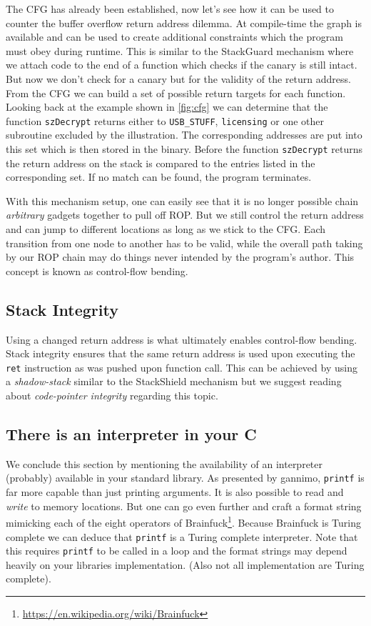 \documentclass[article]{uibk}
\begin{document}
The CFG has already been established, now let's see how it can be used to
counter the buffer overflow return address dilemma. At compile-time the graph
is available and can be used to create additional constraints which the program
must obey during runtime. This is similar to the StackGuard mechanism where we
attach code to the end of a function which checks if the canary is still
intact. But now we don't check for a canary but for the validity of the return
address. From the CFG we can build a set of possible return targets for each
function. Looking back at the example shown in \cref{fig:cfg} we can determine
that the function \texttt{szDecrypt} returns either to \texttt{USB\_STUFF},
\texttt{licensing} or one other subroutine excluded by the illustration. The
corresponding addresses are put into this set which is then stored in the
binary. Before the function \texttt{szDecrypt} returns the return address on
the stack is compared to the entries listed in the corresponding set. If no
match can be found, the program terminates.

With this mechanism setup, one can easily see that it is no longer possible
chain \emph{arbitrary} gadgets together to pull off ROP. But we still control
the return address and can jump to different locations as long as we stick to
the CFG. Each transition from one node to another has to be valid, while the
overall path taking by our ROP chain may do things never intended by the
program's author. This concept is known as control-flow bending.~
\cite{cf_bending}

\subsection{Stack Integrity}

Using a changed return address is what ultimately enables control-flow bending.
Stack integrity ensures that the same return address is used upon executing the
\texttt{ret} instruction as was pushed upon function call. This can be achieved
by using a \textit{shadow-stack} similar to the StackShield mechanism but we
suggest reading about \textit{code-pointer integrity} \cite{cpi} regarding this
topic.

\subsection{There is an interpreter in your C}

We conclude this section by mentioning the availability of an interpreter
(probably) available in your standard library. As presented by gannimo,
\texttt{printf} is far more capable than just printing arguments. It is also
possible to read and \emph{write} to memory locations. But one can go even
further and craft a format string mimicking each of the eight operators of
Brainfuck\footnote{\url{https://en.wikipedia.org/wiki/Brainfuck}}. Because
Brainfuck is Turing complete we can deduce that \texttt{printf} is a Turing
complete interpreter. Note that this requires \texttt{printf} to be called in a
loop and the format strings may depend heavily on your libraries
implementation. (Also not all implementation are Turing complete).
\end{document}
